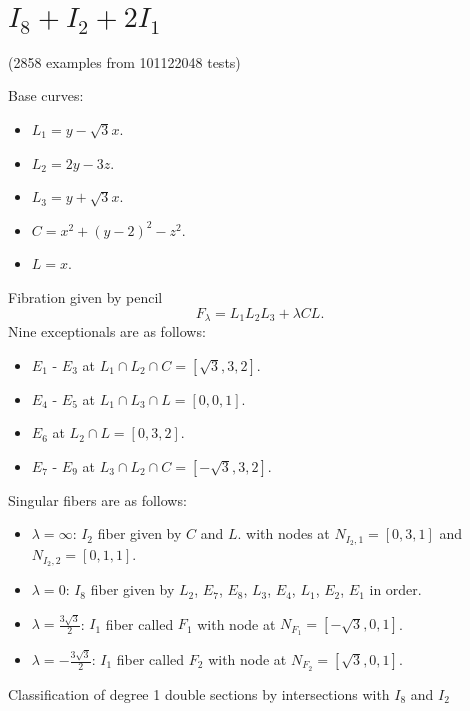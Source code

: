 \documentclass{article}
\begin{document}
\section{$I_8 + I_2 + 2I_1$}

(2858 examples from 101122048 tests)

Base curves:
\begin{itemize}
  \item $L_1 = y - \sqrt{3}x$.
  \item $L_2 = 2y - 3z$.
  \item $L_3 = y + \sqrt{3}x$.
  \item $C = x^2 + (y-2)^2 - z^2$.
  \item $L = x$.
\end{itemize}
Fibration given by pencil
\[F_{\lambda} = L_1L_2L_3 + \lambda CL.\]
Nine exceptionals are as follows:
\begin{itemize}
  \item $E_1$ - $E_3$ at $L_1 \cap L_2 \cap C = [\sqrt{3},3,2]$.
  \item $E_4$ - $E_5$ at $L_1 \cap L_3 \cap L = [0,0,1]$.
  \item $E_6$ at $L_2 \cap L = [0,3,2]$.
  \item $E_7$ - $E_9$ at $L_3 \cap L_2 \cap C = [-\sqrt{3},3,2]$.
\end{itemize}
Singular fibers are as follows:
\begin{itemize}
  \item $\lambda = \infty$: $I_2$ fiber given by $C$ and $L$. with nodes at $N_{I_2,1} = [0,3,1]$ and $N_{I_2,2} = [0,1,1]$.
  \item $\lambda = 0$: $I_8$ fiber given by $L_2$, $E_7$, $E_8$, $L_3$, $E_4$, $L_1$, $E_2$, $E_1$ in order.
  \item $\lambda = \frac{3\sqrt{3}}{2}$: $I_1$ fiber called $F_1$ with node at $N_{F_1} = [-\sqrt{3},0,1]$.
  \item $\lambda = -\frac{3\sqrt{3}}{2}$: $I_1$ fiber called $F_2$ with node at $N_{F_2} = [\sqrt{3},0,1]$.
\end{itemize}

\begin{center}
Classification of degree 1 double sections by intersections with $I_8$ and $I_2$
\end{center}
\end{document}
